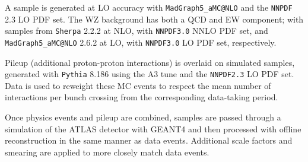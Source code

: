 A \tty sample is generated at \ac{LO} accuracy with \verb|MadGraph5_aMC@NLO| and
the \verb|NNPDF| 2.3 \ac{LO} \ac{PDF} set. %
The WZ background has both a \ac{QCD} and \ac{EW} component; with samples from
\verb|Sherpa| 2.2.2 %
at \ac{NLO}, with \verb|NNPDF3.0| \ac{NNLO} \ac{PDF} set, and
\verb|MadGraph5_aMC@NLO| 2.6.2 %
at \ac{LO}, with \verb|NNPDF3.0| \ac{LO} \ac{PDF} set, respectively.

Pileup (additional proton-proton interactions) is overlaid on simulated samples,
generated with \verb|Pythia| 8.186 using the A3 tune %
and the \verb|NNPDF2.3| \ac{LO} \ac{PDF} set. %
Data is used to reweight these \ac{MC} events to respect the mean number of
interactions per bunch crossing from the corresponding data-taking period.

Once physics events and pileup are combined, samples are passed through a
simulation of the \ac{ATLAS} detector with GEANT4 %
and then processed with offline reconstruction in the same manner as data
events. Additional scale factors and smearing are applied to more closely match
data events.
